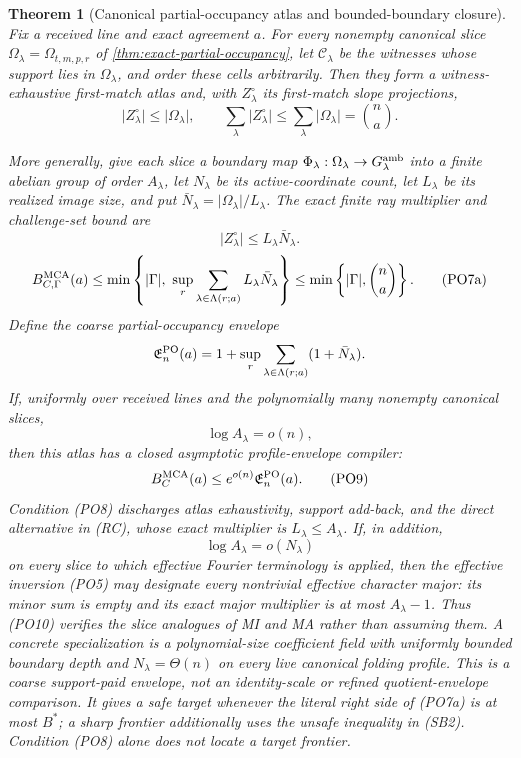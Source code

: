 \documentclass[12pt,a4paper]{amsart}
\numberwithin{equation}{section}
\newtheorem{theorem}{Theorem}[section]
\theoremstyle{remark}
\newcommand{\Ccal}{\mathcal C}
\newcommand{\abs}[1]{\lvert #1\rvert}
\begin{document}
\begin{theorem}[Canonical partial-occupancy atlas and bounded-boundary closure]
\label{thm:canonical-partial-occupancy-atlas}
Fix a received line and exact agreement \(a\).  For every nonempty
canonical slice \(\Omega_\lambda=\Omega_{t,m,p,r}\) of
\cref{thm:exact-partial-occupancy}, let \(\Ccal_\lambda\) be the witnesses
whose support lies in \(\Omega_\lambda\), and order these cells
arbitrarily.  Then they form a witness-exhaustive first-match atlas and,
with \(Z_\lambda^\circ\) its first-match slope projections,
\[
 \abs{Z_\lambda^\circ}\le\abs{\Omega_\lambda},
 \qquad
 \sum_\lambda\abs{Z_\lambda^\circ}
 \le\sum_\lambda\abs{\Omega_\lambda}=\binom na.    \tag{PO6}
\]

More generally, give each slice a boundary map
\(\Phi_\lambda:\Omega_\lambda\to G_\lambda^{\rm amb}\) into a finite
abelian group of order \(A_\lambda\), let \(N_\lambda\) be its
active-coordinate count, let \(L_\lambda\) be its realized image size,
and put
\(\bar N_\lambda=\abs{\Omega_\lambda}/L_\lambda\).  The exact finite ray
multiplier and challenge-set bound are
\[
             \abs{Z_\lambda^\circ}
             \le L_\lambda\bar N_\lambda.          \tag{PO7}
\]
\[
 B_{C,\Gamma}^{\rm MCA}(a)
 \le\min\left\{\abs\Gamma,\
       \sup_r\sum_{\lambda\in\Lambda(r;a)}
              L_\lambda\bar N_\lambda\right\}
 \le\min\left\{\abs\Gamma,\binom na\right\}.        \tag{PO7a}
\]
Define the coarse partial-occupancy envelope
\[
 \mathfrak E_n^{\rm PO}(a)
 =1+\sup_r\sum_{\lambda\in\Lambda(r;a)}(1+\bar N_\lambda).
\]
If, uniformly over received lines and the polynomially many nonempty
canonical slices,
\[
                         \log A_\lambda=o(n),       \tag{PO8}
\]
then this atlas has a closed asymptotic profile-envelope compiler:
\[
 B_{C}^{\rm MCA}(a)\le
 e^{o(n)}\mathfrak E_n^{\rm PO}(a).                \tag{PO9}
\]
Condition \textup{(PO8)} discharges atlas exhaustivity, support add-back,
and the direct alternative in \textup{(RC)}, whose exact multiplier is
\(L_\lambda\le A_\lambda\).  If, in addition,
\[
                         \log A_\lambda=o(N_\lambda) \tag{PO10}
\]
on every slice to which effective Fourier terminology is applied, then
the effective inversion \textup{(PO5)} may designate every nontrivial
effective character major: its minor sum is empty and its exact major
multiplier is at most \(A_\lambda-1\).  Thus \textup{(PO10)} verifies the
slice analogues of MI and MA rather than assuming them.  A concrete
specialization is a polynomial-size coefficient field with uniformly
bounded boundary depth and \(N_\lambda=\Theta(n)\) on every live canonical
folding profile.  This is a coarse support-paid envelope, not an
identity-scale or refined quotient-envelope comparison.  It gives a safe
target whenever the literal right side of \textup{(PO7a)} is at most
\(B^*\); a sharp frontier additionally uses the unsafe inequality in
\textup{(SB2)}.  Condition \textup{(PO8)} alone does not locate a target
frontier.
\end{theorem}
\end{document}
